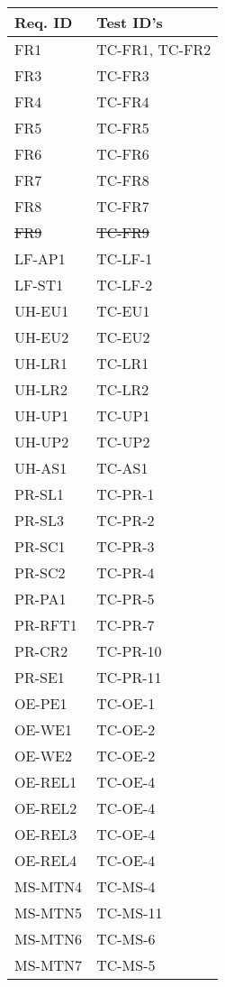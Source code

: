 \documentclass[12pt, titlepage]{article}
\begin{document}
\begin{longtable}{|l|l|}
  \hline
  \textbf{Req. ID} & \textbf{Test ID's} \\
  \hline
  FR1 & TC-FR1, TC-FR2\\ \hline
  FR3 & TC-FR3\\ \hline
  FR4 & TC-FR4\\ \hline
  FR5 & TC-FR5\\ \hline
  FR6 & TC-FR6\\ \hline
  FR7 & TC-FR8\\ \hline
  FR8 & TC-FR7\\ \hline
  \sout{FR9} & \sout{TC-FR9}\\ \hline
  LF-AP1 & TC-LF-1 \\ \hline
  LF-ST1 & TC-LF-2 \\ \hline
  UH-EU1 & TC-EU1\\ \hline
  UH-EU2 & TC-EU2\\ \hline
  UH-LR1 & TC-LR1\\ \hline
  UH-LR2 & TC-LR2\\ \hline
  UH-UP1 & TC-UP1\\ \hline
  UH-UP2 & TC-UP2\\ \hline
  UH-AS1 & TC-AS1\\ \hline
  PR-SL1 & TC-PR-1\\ \hline
  PR-SL3 & TC-PR-2\\ \hline
  PR-SC1 & TC-PR-3\\ \hline
  PR-SC2 & TC-PR-4\\ \hline
  PR-PA1 & TC-PR-5\\ \hline
  PR-RFT1 & TC-PR-7\\ \hline
  PR-CR2 & TC-PR-10\\ \hline
  PR-SE1 & TC-PR-11\\ \hline
  OE-PE1 & TC-OE-1 \\ \hline
  OE-WE1 & TC-OE-2 \\ \hline
  OE-WE2 & TC-OE-2 \\ \hline
  OE-REL1 & TC-OE-4 \\ \hline
  OE-REL2 & TC-OE-4 \\ \hline
  OE-REL3 & TC-OE-4 \\ \hline
  OE-REL4 & TC-OE-4 \\ \hline
  MS-MTN4 & TC-MS-4 \\ \hline
  MS-MTN5 & TC-MS-11 \\ \hline
  MS-MTN6 & TC-MS-6 \\ \hline
  MS-MTN7 & TC-MS-5 \\ \hline

\end{longtable}
\end{document}
